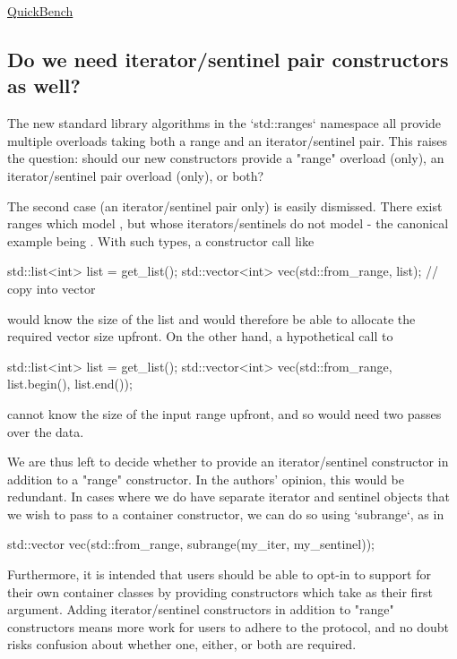 \documentclass{wg21}
\begin{document}
\href{https://quick-bench.com/q/sGkLaZF8I-d0-EOJETmAtVKKk9k}{{QuickBench}}



\subsection{Do we need iterator/sentinel pair constructors as well?}


The new standard library algorithms in the `std::ranges` namespace all provide multiple overloads taking both a range and an iterator/sentinel pair. This raises the question: should our new constructors provide a "range" overload (only), an iterator/sentinel pair overload (only), or both?

The second case (an iterator/sentinel pair only) is easily dismissed. There exist ranges which model , but whose iterators/sentinels do not model  - the canonical example being . With such types, a constructor call like

\begin{colorblock}
std::list<int> list = get_list();
std::vector<int> vec(std::from_range, list); // copy into vector
\end{colorblock}

would know the size of the list and would therefore be able to allocate the required vector size upfront. On the other hand, a hypothetical call to

\begin{colorblock}
std::list<int> list = get_list();
std::vector<int> vec(std::from_range, list.begin(), list.end());
\end{colorblock}

cannot know the size of the input range upfront, and so would need two passes over the data.

We are thus left to decide whether to provide an iterator/sentinel constructor in addition to a "range" constructor. In the authors' opinion, this would be redundant. In cases where we do have separate iterator and sentinel objects that we wish to pass to a container constructor, we can do so using `subrange`, as in

\begin{colorblock}
std::vector vec(std::from_range, subrange(my_iter, my_sentinel));
\end{colorblock}

Furthermore, it is intended that users should be able to opt-in to  support for their own container classes by providing constructors which take  as their first argument. Adding iterator/sentinel constructors in addition to "range" constructors means more work for users to adhere to the protocol, and no doubt risks confusion about whether one, either, or both are required.
\end{document}
